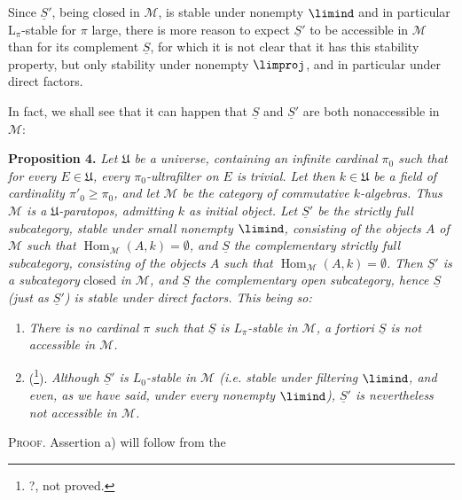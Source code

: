 Since $\underline{S}'$, being closed in $\mathcal{M}$, is stable under nonempty $\limind$ and in particular $\mathrm{L}_\pi$-stable for $\pi$ large, there is more reason to expect $\underline{S}'$ to be accessible in $\mathcal{M}$ than for its complement $\underline{S}$, for which it is not clear that it has this stability property, but only stability under nonempty $\limproj$, and in particular under direct factors.

In fact, we shall see that it can happen that $\underline{S}$ and $\underline{S}'$ are both nonaccessible in $\mathcal{M}$:

\textbf{Proposition 4.} \textit{Let $\mathfrak{U}$ be a universe, containing an infinite cardinal $\pi_0$ such that for every $E\in\mathfrak{U}$, every $\pi_0$-ultrafilter on $E$ is trivial. Let then $k\in\mathfrak{U}$ be a field of cardinality $\pi'_0\geqslant\pi_0$, and let $\mathcal{M}$ be the category}
\textit{of commutative $k$-algebras. Thus $\mathcal{M}$ is a $\mathfrak{U}$-paratopos, admitting $k$ as initial object. Let $\underline{S}'$ be the strictly full subcategory, stable under small nonempty $\limind$, consisting of the objects $A$ of $\mathcal{M}$ such that $\operatorname{Hom}_{\mathcal{M}}(A,k)=\emptyset$, and $\underline{S}$ the complementary strictly full subcategory, consisting of the objects $A$ such that $\operatorname{Hom}_{\mathcal{M}}(A,k)=\emptyset$. Then $\underline{S}'$ is a subcategory} closed \textit{in $\mathcal{M}$, and $\underline{S}$ the complementary open subcategory, hence $\underline{S}$ (just as $\underline{S}'$) is stable under direct factors. This being so:} %
\begin{enumerate}[label={}]
\item[\textit{a)}] \textit{There is no cardinal $\pi$ such that $\underline{S}$ is $L_\pi$-stable in $\mathcal{M}$, a fortiori $\underline{S}$ is not accessible in $\mathcal{M}$.}
\item[\textit{b)}] (\footnote[207]{?, not proved.}). \textit{Although $\underline{S}'$ is $L_0$-stable in $\mathcal{M}$ (i.e. stable under filtering $\limind$, and even, as we have said, under every nonempty $\limind$), $\underline{S}'$ is nevertheless not accessible in $\mathcal{M}$.}
\end{enumerate}
\noindent\textsc{Proof}. Assertion a) will follow from the

